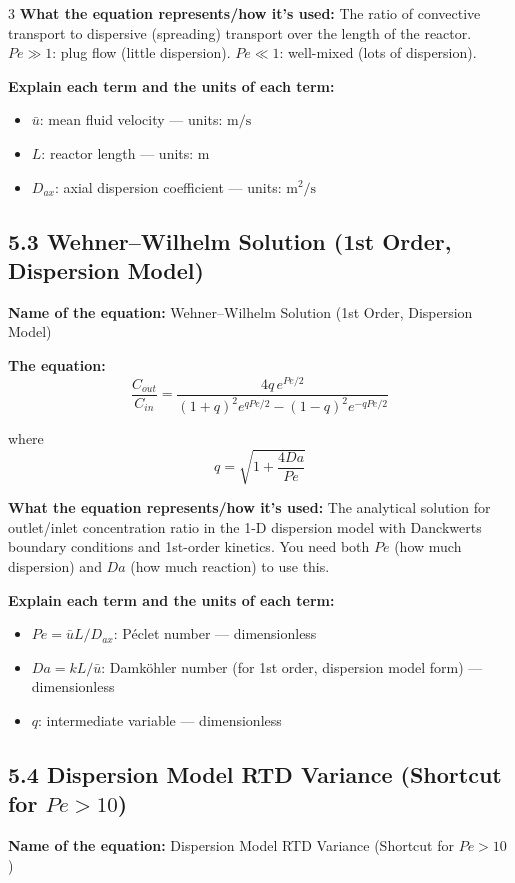 \documentclass[8pt]{extarticle}
\begin{document}
\begin{multicols*}{3}
\textbf{What the equation represents/how it's used:} The ratio of convective transport to dispersive (spreading) transport over the length of the reactor. \(Pe\gg 1\): plug flow (little dispersion). \(Pe\ll 1\): well-mixed (lots of dispersion).

\textbf{Explain each term and the units of each term:}
\begin{itemize}
\item \(\bar{u}\): mean fluid velocity --- units: \(\mathrm{m/s}\)
\item \(L\): reactor length --- units: \(\mathrm{m}\)
\item \(D_{ax}\): axial dispersion coefficient --- units: \(\mathrm{m^2/s}\)
\end{itemize}

\subsection*{5.3 Wehner--Wilhelm Solution (1st Order, Dispersion Model)}

\textbf{Name of the equation:} Wehner--Wilhelm Solution (1st Order, Dispersion Model)

\textbf{The equation:}
\[
\frac{C_{out}}{C_{in}}
=
\frac{4q\,e^{Pe/2}}
{
(1+q)^2e^{qPe/2}
-
(1-q)^2e^{-qPe/2}
}
\]

where
\[
q=\sqrt{1+\frac{4Da}{Pe}}
\]

\textbf{What the equation represents/how it's used:} The analytical solution for outlet/inlet concentration ratio in the 1-D dispersion model with Danckwerts boundary conditions and 1st-order kinetics. You need both \(Pe\) (how much dispersion) and \(Da\) (how much reaction) to use this.

\textbf{Explain each term and the units of each term:}
\begin{itemize}
\item \(Pe=\bar{u}L/D_{ax}\): P\'eclet number --- dimensionless
\item \(Da=kL/\bar{u}\): Damk\"ohler number (for 1st order, dispersion model form) --- dimensionless
\item \(q\): intermediate variable --- dimensionless
\end{itemize}

\subsection*{5.4 Dispersion Model RTD Variance (Shortcut for \(Pe>10\))}

\textbf{Name of the equation:} Dispersion Model RTD Variance (Shortcut for \(Pe>10\))


\end{multicols*}
\end{document}

